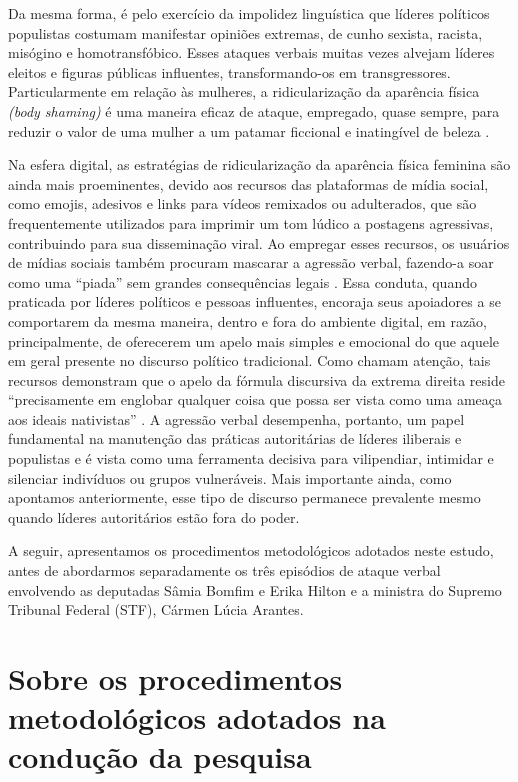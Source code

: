 \documentclass[portuguese]{textolivre}
\begin{document}
Da mesma forma, é pelo exercício da impolidez linguística que líderes políticos populistas costumam manifestar opiniões extremas, de cunho sexista, racista, misógino e homotransfóbico. Esses ataques verbais muitas vezes alvejam líderes eleitos e figuras públicas influentes, transformando-os em transgressores. Particularmente em relação às mulheres, a ridicularização da aparência física \textit{(body shaming)} é uma maneira eficaz de ataque, empregado, quase sempre, para reduzir o valor de uma mulher a um patamar ficcional e inatingível de beleza \cite{oliveira2025}.

Na esfera digital, as estratégias de ridicularização da aparência física feminina são ainda mais proeminentes, devido aos recursos das plataformas de mídia social, como emojis, adesivos e links para vídeos remixados ou adulterados, que são frequentemente utilizados para imprimir um tom lúdico a postagens agressivas, contribuindo para sua disseminação viral. Ao empregar esses recursos, os usuários de mídias sociais também procuram mascarar a agressão verbal, fazendo-a soar como uma ``piada'' sem grandes consequências legais \cite{oliveira2025}. Essa conduta, quando praticada por líderes políticos e pessoas influentes, encoraja seus apoiadores a se comportarem da mesma maneira, dentro e fora do ambiente digital, em razão, principalmente, de oferecerem um apelo mais simples e emocional do que aquele em geral presente no discurso político tradicional. Como \textcite{zottola2022} chamam atenção, tais recursos demonstram que o apelo da fórmula discursiva da extrema direita reside ``precisamente em englobar qualquer coisa que possa ser vista como uma ameaça aos ideais nativistas'' \cite[p. 264]{zottola2022}. A agressão verbal desempenha, portanto, um papel fundamental na manutenção das práticas autoritárias de líderes iliberais e populistas e é vista como uma ferramenta decisiva para vilipendiar, intimidar e silenciar indivíduos ou grupos vulneráveis. Mais importante ainda, como apontamos anteriormente, esse tipo de discurso permanece prevalente mesmo quando líderes autoritários estão fora do poder.

A seguir, apresentamos os procedimentos metodológicos adotados neste estudo, antes de abordarmos separadamente os três episódios de ataque verbal envolvendo as deputadas Sâmia Bomfim e Erika Hilton e a ministra do Supremo Tribunal Federal (STF), Cármen Lúcia Arantes.


\section{Sobre os procedimentos metodológicos adotados na condução da pesquisa}\label{sec-2}
\end{document}
